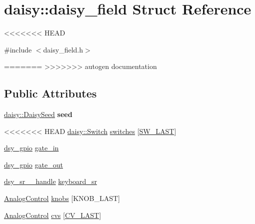 \hypertarget{structdaisy_1_1daisy__field}{}\section{daisy\+:\+:daisy\+\_\+field Struct Reference}
\label{structdaisy_1_1daisy__field}
<<<<<<< HEAD


{\ttfamily \#include $<$daisy\+\_\+field.\+h$>$}

=======
>>>>>>> autogen documentation
\subsection*{Public Attributes}
\begin{DoxyCompactItemize}
\item 
\mbox{\label{structdaisy_1_1daisy__field_a19ef7951ee671c5d575fdb40b7257e82}} 
\hyperlink{classdaisy_1_1_daisy_seed}{daisy\+::\+Daisy\+Seed} {\bfseries seed}
\item 
<<<<<<< HEAD
\hyperlink{classdaisy_1_1_switch}{daisy\+::\+Switch} \hyperlink{structdaisy_1_1daisy__field_aca25d731df8f2a9a90dad97ecb5f40fa}{switches} \mbox{[}\hyperlink{namespacedaisy_addc77b0887e2ab2d7341ab97015ce26fad28ab1e6a1609ca7d09b9ffd594ebde5}{S\+W\+\_\+\+L\+A\+ST}\mbox{]}
\item 
\hyperlink{structdsy__gpio}{dsy\+\_\+gpio} \hyperlink{structdaisy_1_1daisy__field_a0998eb84a118dc2fc8c7e8cf8f84f01d}{gate\+\_\+in}
\item 
\hyperlink{structdsy__gpio}{dsy\+\_\+gpio} \hyperlink{structdaisy_1_1daisy__field_af0b4e5553d91f35b328195bba616780a}{gate\+\_\+out}
\item 
\hyperlink{structdsy__sr__4021__handle}{dsy\+\_\+sr\+\_\+\_\+handle} \hyperlink{structdaisy_1_1daisy__field_aaf362bf91cd2c2bcf1185849a623d101}{keyboard\+\_\+sr}
\item 
\hyperlink{classdaisy_1_1_analog_control}{Analog\+Control} \hyperlink{structdaisy_1_1daisy__field_a21061013bfbcd45b3837761c17b41410}{knobs} \mbox{[}K\+N\+O\+B\+\_\+\+L\+A\+ST\mbox{]}
\item 
\hyperlink{classdaisy_1_1_analog_control}{Analog\+Control} \hyperlink{structdaisy_1_1daisy__field_abc14be5d1126a04a15e5aacca45768f7}{cvs} \mbox{[}\hyperlink{namespacedaisy_a6be3271bd09db635a6318987eb086c07a085d02d6cdf0f9a6b575f7c9dd3c6813}{C\+V\+\_\+\+L\+A\+ST}\mbox{]}
\end{DoxyCompactItemize}


